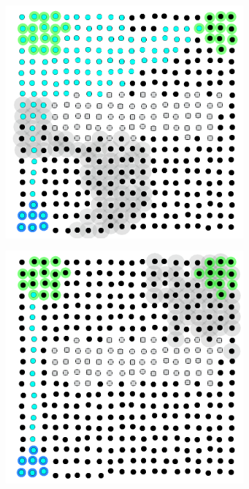 \begin{figure}
\begin{subfigure}[b]{0.24\linewidth}
      \caption{}
      \label{acsos2023-frp:fig:expansion}
  \end{subfigure}\hfill
  \begin{subfigure}[b]{0.24\linewidth}
      \centering
      \includegraphics[width=\textwidth]{papers/acsos2023-frp/imgs/channel240.0.png}
      \caption{}
      \label{acsos2023-frp:fig:revaluation}
  \end{subfigure}\hfill
  \begin{subfigure}[b]{0.24\linewidth}
      \centering
      \includegraphics[width=\textwidth]{papers/acsos2023-frp/imgs/channel270.0.png}

\end{subfigure}
\end{figure}
